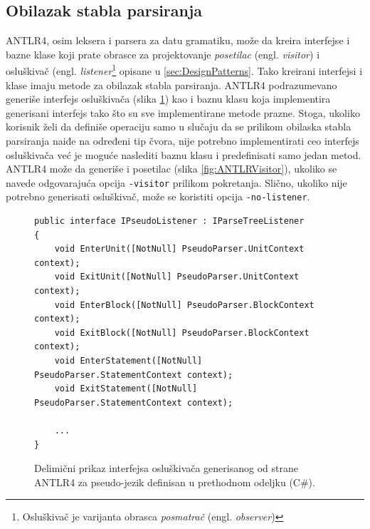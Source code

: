 \subsection{Obilazak stabla parsiranja}
\label{subsec:ANTLRParserIntegration}

ANTLR4, osim leksera i parsera za datu gramatiku, može da kreira interfejse i bazne klase koji prate obrasce za projektovanje \emph{posetilac} (engl. \emph{visitor}) i osluškivač (engl. \emph{listener}\footnote{Osluškivač je varijanta obrasca \emph{posmatrač} (engl. \emph{observer})} opisane u \ref{sec:DesignPatterns}. Tako kreirani interfejsi i klase imaju metode za obilazak stabla parsiranja. ANTLR4 podrazumevano generiše interfejs osluškivača (slika \ref{fig:ANTLRListener}) kao i baznu klasu koja implementira generisani interfejs tako što su sve implementirane metode prazne. Stoga, ukoliko korisnik želi da definiše operaciju samo u slučaju da se prilikom obilaska stabla parsiranja naiđe na određeni tip čvora, nije potrebno implementirati ceo interfejs osluškivača već je moguće naslediti baznu klasu i predefinisati samo jedan metod. ANTLR4 može da generiše i posetilac (slika \ref{fig:ANTLRVisitor}), ukoliko se navede odgovarajuća opcija \texttt{-visitor} prilikom pokretanja. Slično, ukoliko nije potrebno generisati osluškivač, može se koristiti opcija \texttt{-no-listener}.

\begin{figure}[h!]
\begin{lstlisting}
public interface IPseudoListener : IParseTreeListener
{
    void EnterUnit([NotNull] PseudoParser.UnitContext context);
    void ExitUnit([NotNull] PseudoParser.UnitContext context);
    void EnterBlock([NotNull] PseudoParser.BlockContext context);
    void ExitBlock([NotNull] PseudoParser.BlockContext context);
    void EnterStatement([NotNull] PseudoParser.StatementContext context);
    void ExitStatement([NotNull] PseudoParser.StatementContext context);
    
    ...
}
\end{lstlisting}
\caption{Delimični prikaz interfejsa osluškivača generisanog od strane ANTLR4 za pseudo-jezik definisan u prethodnom odeljku (C\#).}
\label{fig:ANTLRListener}
\end{figure}

